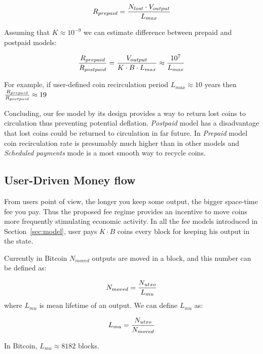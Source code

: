 \documentclass[]{llncs}   %
\begin{document}
\begin{equation}
R_{prepaid} = {N_{lost} \cdot V_{output} \over L_{max}}
\end{equation}

Assuming that $K\approx10^{-9}$ we can estimate difference between prepaid and postpaid models:

\begin{equation}
{R_{prepaid} \over R_{postpaid}} = {V_{output} \over  K \cdot B \cdot L_{max}} \approx {10^7 \over L_{max}}
\end{equation}

For example, if user-defined coin recirculation period $L_{max}\approx10$ years then ${R_{prepaid} \over R_{postpaid}} \approx 19$

Concluding, our fee model by its design provides a way to return lost coins to circulation thus preventing potential deflation. \textit{Postpaid} model has a disadvantage  that lost coins could be returned to circulation in far future. In \textit{Prepaid} model coin recirculation rate is presumably much higher than in other models and \textit{Scheduled payments} mode is a most smooth way to recycle coins.



\subsection{User-Driven Money flow}
\label{sec:flow}

From users point of view, the longer you keep some output, the bigger space-time fee you pay. Thus the proposed fee regime provides an incentive to move coins more frequently stimulating economic activity. In all the fee models introduced in Section~\ref{sec:model}, user pays ${K \cdot B}$ coins every block for keeping his output in the state. 

Currently in Bitcoin $N_{moved}$ outputs are moved in a block, and this number can be defined as: 

\begin{equation}
N_{moved} = {N_{utxo} \over L_{mu}} %
\end{equation}
where $L_{mu}$ is mean lifetime of an output. We can define $L_{mu}$ as:

\begin{equation}
L_{mu} = {N_{utxo} \over {N_{moved}}}
\end{equation}

In Bitcoin, $L_{mu} \approx 8182$ blocks.
\end{document}
